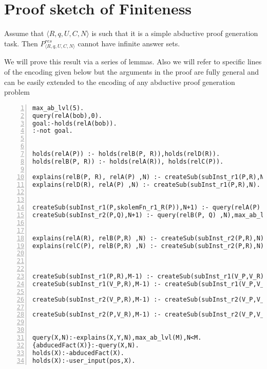\section{Proof sketch of Finiteness}\label{sec:proof_finiteness}

\begin{theorem}[Finiteness]\label{thm:finiteness}
Assume that $\langle R,q,U,C,N \rangle$ is such that it is a simple abductive proof generation task. %
Then $P_{\langle R,q,U,C,N \rangle}^{res}$ cannot have infinite answer sets. 
\end{theorem}
We will prove this result via a series of lemmas. Also we will refer to specific lines of the encoding given below but the arguments in the proof are fully general and can be easily extended to the encoding of any abductive proof generation problem

\begin{lstlisting}[numbers=left]
max_ab_lvl(5).
query(relA(bob),0).
goal:-holds(relA(bob)).
:-not goal.


holds(relA(P)) :- holds(relB(P, R)),holds(relD(R)).
holds(relB(P, R)) :- holds(relA(R)), holds(relC(P)).

explains(relB(P, R), relA(P) ,N) :- createSub(subInst_r1(P,R),N).
explains(relD(R), relA(P) ,N) :- createSub(subInst_r1(P,R),N).


createSub(subInst_r1(P,skolemFn_r1_R(P)),N+1) :- query(relA(P) ,N),max_ab_lvl(M),N<M-1.
createSub(subInst_r2(P,Q),N+1) :- query(relB(P, Q) ,N),max_ab_lvl(M),N<M-1.


explains(relA(R), relB(P,R) ,N) :- createSub(subInst_r2(P,R),N).
explains(relC(P), relB(P,R) ,N) :- createSub(subInst_r2(P,R),N).



createSub(subInst_r1(P,R),M-1) :- createSub(subInst_r1(V_P,V_R),N), holds(relB(P, R)),max_ab_lvl(M).
createSub(subInst_r1(V_P,R),M-1) :- createSub(subInst_r1(V_P,V_R),N), holds(relD(R)),max_ab_lvl(M).

createSub(subInst_r2(V_P,R),M-1) :- createSub(subInst_r2(V_P,V_R),N), holds(relA(R)),max_ab_lvl(M).

createSub(subInst_r2(P,V_R),M-1) :- createSub(subInst_r2(V_P,V_R),N), holds(relC(P)),max_ab_lvl(M).


query(X,N):-explains(X,Y,N),max_ab_lvl(M),N<M.
{abducedFact(X)}:-query(X,N).
holds(X):-abducedFact(X).
holds(X):-user_input(pos,X).
\end{lstlisting}


